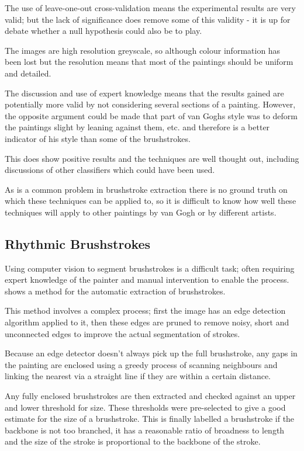 \documentclass[conference]{IEEEtran}
\begin{document}
The use of leave-one-out cross-validation means the experimental results are
very valid; but the lack of significance does remove some of this validity - it
is up for debate whether a null hypothesis could also be to play.

The images are high resolution greyscale, so although colour information has
been lost but the resolution means that most of the paintings should be uniform
and detailed.

The discussion and use of expert knowledge means that the results gained are
potentially more valid by not considering several sections of a painting.
However, the opposite argument could be made that part of van Goghs style was
to deform the paintings slight by leaning against them, etc. and therefore is a
better indicator of his style than some of the brushstrokes.

This does show positive results and the techniques are well thought out,
including discussions of other classifiers which could have been used.

As is a common problem in brushstroke extraction there is no ground truth on
which these techniques can be applied to, so it is difficult to know how well
these techniques will apply to other paintings by van Gogh or by different
artists.


\subsection{Rhythmic Brushstrokes}

Using computer vision to segment brushstrokes is a difficult task; often
requiring expert knowledge of the painter and manual intervention to enable the
process. \cite{jia12rhythmic} shows a method for the automatic extraction of
brushstrokes.

This method involves a complex process; first the image has an edge detection
algorithm applied to it, then these edges are pruned to remove noisy, short and
unconnected edges to improve the actual segmentation of strokes.

Because an edge detector doesn't always pick up the full brushstroke, any gaps
in the painting are enclosed using a greedy process of scanning neighbours and
linking the nearest via a straight line if they are within a certain distance.

Any fully enclosed brushstrokes are then extracted and checked against an upper
and lower threshold for size. These thresholds were pre-selected to give a good
estimate for the size of a brushstroke. This is finally labelled a brushstroke
if the backbone is not too branched, it has a reasonable ratio of broadness to
length and the size of the stroke is proportional to the backbone of the
stroke.
\end{document}
